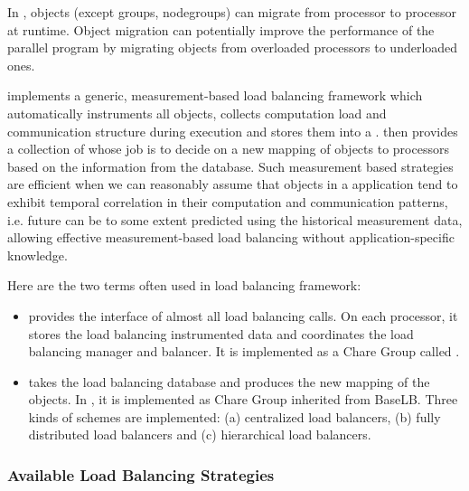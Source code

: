 \label{lbFramework}
\label{migrationlb}

In \charmpp{}, objects (except groups, nodegroups) can migrate from 
processor to processor at runtime. Object migration can potentially 
improve the performance of the parallel program by migrating objects from 
overloaded processors to underloaded ones. 


 \charmpp{} implements a generic, measurement-based load balancing framework
which automatically instruments all \charmpp{} objects, collects computation
load and communication structure during execution and stores them into a
. \charmpp{} then provides a collection of  whose job is to decide on a new mapping of objects to
processors based on the information from the database.  Such measurement based
strategies are efficient when we can reasonably assume that objects in a 
\charmpp{} application tend to exhibit temporal correlation in their
computation and communication patterns, i.e. future can be to some extent
predicted using the historical measurement data, allowing effective
measurement-based load balancing without application-specific knowledge.

Here are the two terms often used in \charmpp{} load balancing framework:
\begin{itemize}
%
\item {} provides the interface of almost all load
balancing calls. On each processor, it stores the load balancing instrumented
data and coordinates the load balancing manager and balancer. It is implemented
as a Chare Group called .
%
\item {} takes the load balancing database and
produces the new mapping of the objects. In \charmpp{}, it is implemented as
Chare Group inherited from BaseLB. Three kinds of schemes are implemented: (a)
centralized load balancers, (b) fully distributed load balancers and (c)
hierarchical load balancers.
%
\end{itemize}

\subsubsection{Available Load Balancing Strategies}

